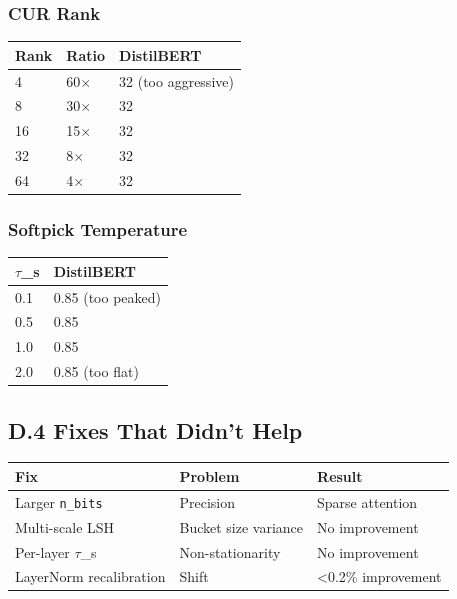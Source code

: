 \subsubsection{CUR Rank}

\begin{table}[H]
\centering
\small
\begin{tabular}{lll}
\toprule
\textbf{Rank} & \textbf{Ratio} & \textbf{DistilBERT} \\
\midrule
4 & 60$\times$ & 32 (too aggressive) \\
8 & 30$\times$ & 32 \\
16 & 15$\times$ & 32 \\
32 & 8$\times$ & 32 \\
64 & 4$\times$ & 32 \\
\bottomrule
\end{tabular}
\end{table}

\subsubsection{Softpick Temperature}

\begin{table}[H]
\centering
\small
\begin{tabular}{ll}
\toprule
\textbf{$\tau$\_s} & \textbf{DistilBERT} \\
\midrule
0.1 & 0.85 (too peaked) \\
0.5 & 0.85 \\
1.0 & 0.85 \\
2.0 & 0.85 (too flat) \\
\bottomrule
\end{tabular}
\end{table}

\subsection{D.4 Fixes That Didn't Help}

\begin{table}[H]
\centering
\small
\begin{tabular}{lll}
\toprule
\textbf{Fix} & \textbf{Problem} & \textbf{Result} \\
\midrule
Larger \texttt{n\_bits} & Precision & Sparse attention \\
Multi-scale LSH & Bucket size variance & No improvement \\
Per-layer $\tau$\_s & Non-stationarity & No improvement \\
LayerNorm recalibration & Shift & \textless{}0.2\% improvement \\
\bottomrule
\end{tabular}
\end{table}

